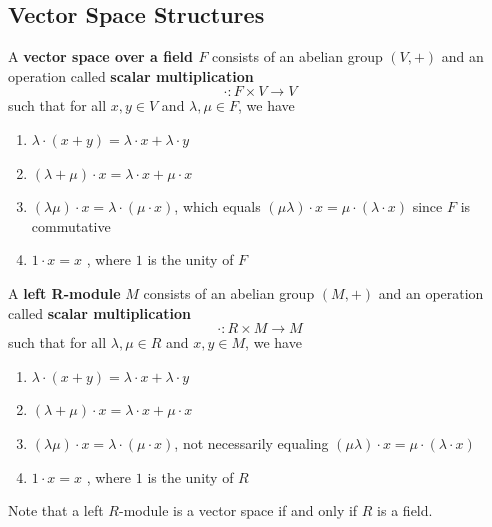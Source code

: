 \documentclass{article}
\begin{document}
  \subsection{Vector Space Structures}

    \begin{definition}
       A \textbf{vector space over a field $F$} consists of an abelian group $(V, +)$ and an operation called \textbf{scalar multiplication} 
       \begin{equation}
         \cdot: F \times V \rightarrow V
       \end{equation}
      such that for all $x, y\in V$ and $\lambda, \mu \in F$, we have 
      \begin{enumerate}
        \item $\lambda \cdot (x + y) = \lambda \cdot x + \lambda \cdot y$
        \item $(\lambda + \mu) \cdot x = \lambda \cdot x + \mu \cdot x$ 
        \item $(\lambda \mu) \cdot x = \lambda \cdot (\mu \cdot x )$, which equals $(\mu \lambda) \cdot x = \mu \cdot (\lambda \cdot x)$ since $F$ is commutative 
        \item $1 \cdot x = x$ , where $1$ is the unity of $F$
      \end{enumerate}
    \end{definition}

    \begin{definition}
      A \textbf{left R-module} $M$ consists of an abelian group $(M, +)$ and an operation called \textbf{scalar multiplication}
      \begin{equation}
        \cdot: R \times M \longrightarrow M
      \end{equation}
      such that for all $\lambda, \mu \in R$ and $x, y \in M$, we have 
      \begin{enumerate}
        \item $\lambda \cdot (x + y) = \lambda \cdot x + \lambda \cdot y$
        \item $(\lambda + \mu) \cdot x = \lambda \cdot x + \mu \cdot x$ 
        \item $(\lambda \mu) \cdot x = \lambda \cdot (\mu \cdot x )$, not necessarily equaling $(\mu \lambda) \cdot x = \mu \cdot (\lambda \cdot x)$
        \item $1 \cdot x = x$ , where $1$ is the unity of $R$
      \end{enumerate}
      Note that a left $R$-module is a vector space if and only if $R$ is a field.
    \end{definition}
\end{document}
